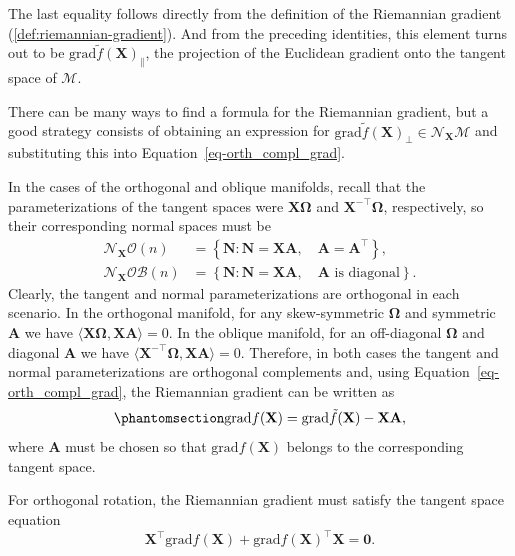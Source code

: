 \documentclass[
  12pt,
  letterpaper,
  article]{scrartcl}
\begin{document}
The last equality follows directly from the definition of the Riemannian
gradient (\ref{def:riemannian-gradient}). And from the preceding
identities, this element turns out to be
\(\text{grad}\tilde{f}(\mathbf{X})_\parallel\), the projection of the
Euclidean gradient onto the tangent space of \(\mathcal{M}\).

There can be many ways to find a formula for the Riemannian gradient,
but a good strategy consists of obtaining an expression for
\(\text{grad}\tilde{f}(\mathbf{X})_\perp \in \mathcal{N}_{\mathbf{X}}\mathcal{M}\)
and substituting this into Equation~\ref{eq-orth_compl_grad}.

In the cases of the orthogonal and oblique manifolds, recall that the
parameterizations of the tangent spaces were \(\mathbf{X\Omega}\) and
\(\mathbf{X}^{-\top}\mathbf{\Omega}\), respectively, so their
corresponding normal spaces must be \[
\begin{aligned}
\mathcal{N}_{\mathbf{X}}\mathcal{O}(n)
&=
\left\{
\mathbf{N}:
\mathbf{N}=\mathbf{X}\mathbf{A},
\quad
\mathbf{A}=\mathbf{A}^\top
\right\},
\\
\mathcal{N}_{\mathbf{X}}\mathcal{OB}(n)
&=
\left\{
\mathbf{N}:
\mathbf{N}=\mathbf{X}\mathbf{A},
\quad
\mathbf{A}
\text{ is diagonal}
\right\}.
\end{aligned}
\] Clearly, the tangent and normal parameterizations are orthogonal in
each scenario. In the orthogonal manifold, for any skew-symmetric
\(\mathbf{\Omega}\) and symmetric \(\mathbf{A}\) we have
\(\langle \mathbf{X\Omega}, \mathbf{XA} \rangle = 0\). In the oblique
manifold, for an off-diagonal \(\mathbf{\Omega}\) and diagonal
\(\mathbf{A}\) we have
\(\langle \mathbf{X}^{-\top}\mathbf{\Omega}, \mathbf{XA} \rangle = 0\).
Therefore, in both cases the tangent and normal parameterizations are
orthogonal complements and, using Equation~\ref{eq-orth_compl_grad}, the
Riemannian gradient can be written as
\begin{equation}\protect\phantomsection\label{eq-riemannian_param}{
\text{grad}f(\mathbf{X})
=
\text{grad}\tilde{f}(\mathbf{X})
-
\mathbf{X}\mathbf{A},
}\end{equation} where \(\mathbf{A}\) must be chosen so that
\(\text{grad}f(\mathbf{X})\) belongs to the corresponding tangent space.

For orthogonal rotation, the Riemannian gradient must satisfy the
tangent space equation \[
\mathbf{X}^\top\text{grad}f(\mathbf{X})
+
\text{grad}f(\mathbf{X})^\top\mathbf{X}
=
\mathbf{0}.
\]
\end{document}
